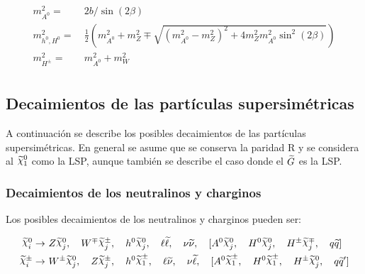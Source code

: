 
\begin{equation}
	\begin{split}
		m_{A^0}^2 = &\ 2b/\sin(2\beta) \\
		m_{h^0 , H^0}^2 = &\ \frac{1}{2}\left( m_{A^0}^2 + m_Z^2 \mp \sqrt{(m_{A^0}^2-m_Z^2)^2 + 4m_Z^2 m_{A^0}^2 \sin^2(2\beta)} \right) \\
		m_{H^{\pm}}^2 = &\ m_{A^0}^2 + m_W^2 \\
	\end{split}
\end{equation}


\subsection{Decaimientos de las partículas supersimétricas}

A continuación se describe los posibles decaimientos de las partículas supersimétricas. En general se asume que se conserva la paridad R y se considera al $\ninoone$ como la LSP, aunque también se describe el caso donde el $\widetilde{G}$ es la LSP.

\subsubsection{Decaimientos de los neutralinos y charginos}

Los posibles decaimientos de los neutralinos y charginos pueden ser:


\begin{equation}
	\begin{split}
		\ggino^0_i \to &\ \Zboson\ggino^0_j,\quad \Wmp\ggino^\pm_j,\quad h^0\ggino^0_j,\quad \ell\slepton,\quad \nu\snu,\quad [\Azero\ggino^0_j,\quad \Hzero\ggino^0_j,\quad \Hpm\ggino^\mp_j,\quad q\squark] \\
		\ggino^\pm_i \to &\ \Wpm\ggino^0_j,\quad \Zboson\ggino^\pm_j,\quad h^0\chinoonepm,\quad \ell\snu,\quad \nu\slepton,\quad [\Azero\chinoonepm,\quad \Hzero\chinoonepm,\quad \Hpm\ggino^0_j,\quad q\squark'] \\
	\end{split}
\end{equation}


